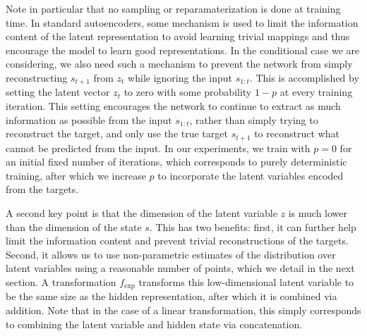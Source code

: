 \documentclass{article}
\begin{document}
Note in particular that no sampling or reparamaterization is done at training time.
In standard autoencoders, some mechanism is used to limit the information content of the latent representation to avoid learning trivial mappings and thus encourage the model to learn good representations.
In the conditional case we are considering, we also need such a mechanism to prevent the network from simply reconstructing $s_{t+1}$ from $z_t$ while ignoring the input $s_{1:t}$.
This is accomplished by setting the latent vector $z_t$ to zero with some probability $1 - p$ at every training iteration.
This setting encourages the network to continue to extract as much information as possible from the input $s_{1:t}$, rather than simply trying to reconstruct the target, and only use the true target $s_{t+1}$ to reconstruct what cannot be predicted from the input.
In our experiments, we train with $p = 0$ for an initial fixed number of iterations, which corresponds to purely deterministic training, after which we increase $p$ to incorporate the latent variables encoded from the targets.

A second key point is that the dimension of the latent variable $z$ is much lower than the dimension of the state $s$.
This has two benefits: first, it can further help limit the information content and prevent trivial reconstructions of the targets.
Second, it allows us to use non-parametric estimates of the distribution over latent variables using a reasonable number of points, which we detail in the next section.
A transformation $f_\text{exp}$ transforms this low-dimensional latent variable to be the same size as the hidden representation, after which it is combined via addition.
Note that in the case of a linear transformation, this simply corresponds to combining the latent variable and hidden state via concatenation.

\end{document}

